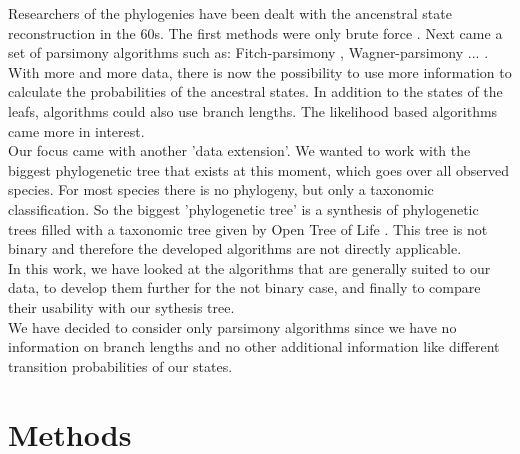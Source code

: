   Researchers of the phylogenies have been dealt with the ancenstral state reconstruction in the 
  60s. The first methods were only brute force . 
  Next came a set of parsimony algorithms such as: Fitch-parsimony \cite{Fitch1971}, 
  Wagner-parsimony \cite{Swofford1987} ... . \\
  With more and more data, there is now the possibility to use more information to calculate the 
  probabilities of the ancestral states. In addition to the states of the leafs, algorithms could 
  also use branch lengths. The likelihood based algorithms came more in interest. \\
  Our focus came with another 'data extension'. We wanted to work with the biggest phylogenetic tree 
  that exists at this moment, which goes over all observed species. For most  species 
  there is no 
  phylogeny, but only a taxonomic classification. So the biggest 'phylogenetic tree' is a synthesis 
  of phylogenetic trees filled with a taxonomic tree given by Open Tree of Life \cite{Hinchliff2015}.
  This tree is not binary and therefore the developed algorithms are not directly applicable. \\
  In this work, we have looked at the algorithms that are generally suited to our data, to develop 
  them further for the not binary case, and finally to compare their usability with our sythesis 
  tree. \\
  We have decided to consider only parsimony algorithms since we have no information on branch 
  lengths and no other additional information like different transition probabilities of our states.

\chapter{Methods}
  
